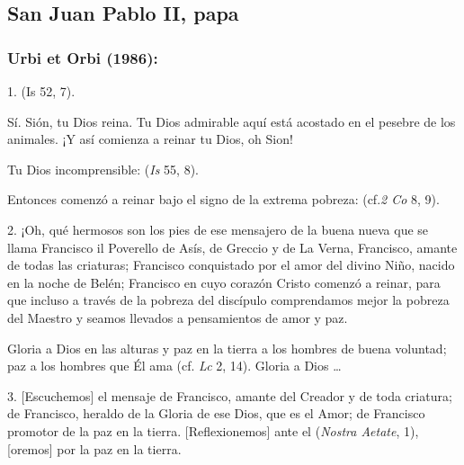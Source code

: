 				\subsection{San Juan Pablo II, papa}
				
					\subsubsection{Urbi et Orbi (1986):}
					
						
						\begin{body}
							1.  (Is 52, 7).
							
							Sí. Sión, tu Dios reina. Tu Dios admirable aquí está acostado en el pesebre de los animales. ¡Y así comienza a reinar tu Dios, oh Sion!
							
							Tu Dios incomprensible:  (\emph{Is} 55, 8).
							
							Entonces comenzó a reinar bajo el signo de la extrema pobreza:  (cf.\emph{2 Co} 8, 9).
							
							2. ¡Oh, qué hermosos son los pies de ese mensajero de la buena nueva que se llama Francisco il Poverello de Asís, de Greccio y de La Verna, Francisco, amante de todas las criaturas; Francisco conquistado por el amor del divino Niño, nacido en la noche de Belén; Francisco en cuyo corazón Cristo comenzó a reinar, para que incluso a través de la pobreza del discípulo comprendamos mejor la pobreza del Maestro y seamos llevados a pensamientos de amor y paz.
							
							Gloria a Dios en las alturas y paz en la tierra a los hombres de buena voluntad; paz a los hombres que Él ama (cf. \emph{Lc} 2, 14). Gloria a Dios \ldots{}
							
							3. {[}Escuchemos{]} el mensaje de Francisco, amante del Creador y de toda criatura; de Francisco, heraldo de la Gloria de ese Dios, que  es el Amor; de Francisco promotor de la paz en la tierra. {[}Reflexionemos{]} ante el  ({\emph{Nostra Aetate}}, 1), {[}oremos{]} por la paz en la tierra.
							

\end{body}
